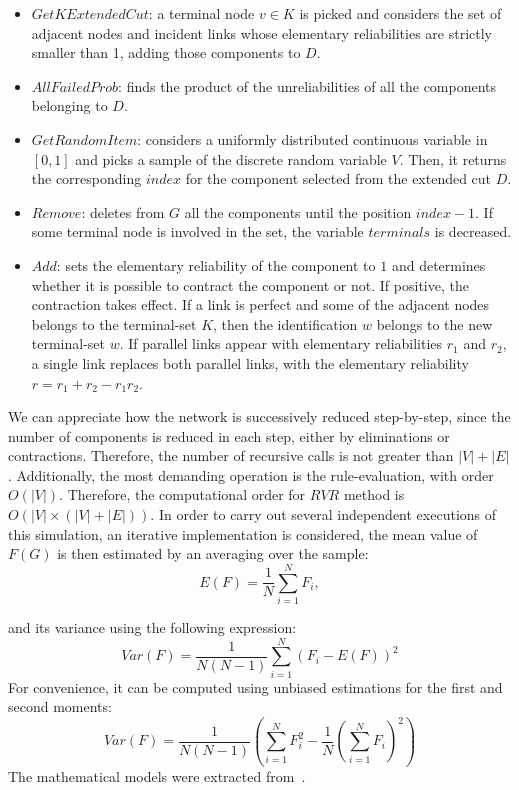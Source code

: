 \begin{itemize}
\item $GetKExtendedCut$: a terminal node $v \in K$ is picked and considers the set of adjacent nodes and incident links whose elementary reliabilities are strictly smaller than 1, adding those components to $D$.
\item $AllFailedProb$: finds the product of the unreliabilities of all the components belonging to $D$.
\item $GetRandomItem$: considers a uniformly distributed continuous variable in $[0,1]$ and picks a sample of the discrete random variable $V$. Then, it returns the corresponding $index$ for the 
component selected from the extended cut $D$.
\item $Remove$: deletes from $G$ all the components until the position $index-1$. If some terminal node is involved in the set, the variable $terminals$ is decreased.  
\item $Add$: sets the elementary reliability of the component to $1$ and determines whether it is possible 
to contract the component or not. If positive, the contraction takes effect. If a link is perfect and 
some of the adjacent nodes belongs to the terminal-set $K$, then the identification $w$ belongs to the new 
terminal-set $w$. If parallel links appear with elementary reliabilities $r_1$ and $r_2$, a single link 
replaces both parallel links, with the elementary reliability $r = r_1 + r_2 - r_1 r_2$.
\end{itemize}

We can appreciate how the network is successively reduced step-by-step, since the number of components 
is reduced in each step, either by eliminations or contractions. Therefore, the number of 
recursive calls is not greater than $|V|+|E|$. Additionally, the most demanding operation is the rule-evaluation,  with order $O(|V|)$. Therefore, the computational order for $RVR$ method is $O(|V| \times (|V|+|E|))$. 
In order to carry out several independent executions of this simulation, 
an iterative implementation is considered, the mean value of 
$F(G)$ is then estimated by an averaging over the sample: 
\begin{equation*}
E(F) = \frac{1}{N}\sum_{i=1}^{N}F_i,
\end{equation*}

and its variance using the following expression:
\begin{equation*}
Var(F) = \frac{1}{N(N-1)}\sum_{i=1}^{N} (F_i-E(F))^2
\end{equation*}
For convenience, it can be computed using unbiased estimations for the first and second moments:
\begin{equation*}
Var(F) = \frac{1}{N(N-1)} \left( \sum_{i=1}^{N}F_{i}^{2}- \frac{1}{N}\left(\sum_{i=1}^{N}F_{i}\right)^2\right)
\end{equation*}
The mathematical models were extracted from~\cite{4}.